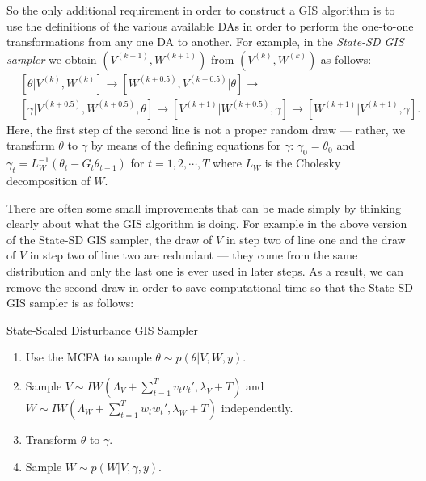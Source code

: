 \documentclass[12pt]{article}
\begin{document}
So the only additional requirement in order to construct a GIS algorithm is to use the definitions of the various available DAs in order to perform the one-to-one transformations from any one DA to another. For example, in the {\it State-SD GIS sampler} we obtain $(V^{(k+1)},W^{(k+1)})$ from $(V^{(k)},W^{(k)})$ as follows:
\begin{align*}
&[\theta|V^{(k)},W^{(k)}] \to [W^{(k+0.5)},V^{(k+0.5)}|\theta] \to\\
&[\gamma|V^{(k+0.5)},W^{(k+0.5)},\theta] \to [V^{(k+1)}|W^{(k+0.5)},\gamma] \to [W^{(k+1)}|V^{(k+1)},\gamma].
\end{align*}
Here, the first step of the second line is not a proper random draw --- rather, we transform $\theta$ to $\gamma$ by means of the defining equations for $\gamma$: $\gamma_0=\theta_0$ and $\gamma_t = L_W^{-1}(\theta_t - G_t\theta_{t-1})$ for $t=1,2,\cdots,T$ where $L_W$ is the Cholesky decomposition of $W$.

There are often some small improvements that can be made simply by thinking clearly about what the GIS algorithm is doing. For example in the above version of the State-SD GIS sampler, the draw of $V$ in step two of line one and the draw of $V$ in step two of line two are redundant --- they come from the same distribution and only the last one is ever used in later steps. As a result, we can remove the second draw in order to save computational time so that the State-SD GIS sampler is as follows:
\begin{alg*}State-Scaled Disturbance GIS Sampler
\label{alg:DLMstateerror}
\begin{enumerate}
\item Use the MCFA to sample $\theta \sim p(\theta|V,W,y)$.
\item Sample $V \sim IW\left(\Lambda_V + \sum_{t=1}^Tv_tv_t',\lambda_V + T\right)$ and $W \sim IW\left(\Lambda_W + \sum_{t=1}^Tw_tw_t',\lambda_{W} + T\right)$ independently.
\item Transform $\theta$ to $\gamma$.
\item Sample $W \sim p(W|V,\gamma,y)$.
\end{enumerate}
\end{alg*}\noindent
\end{document}
